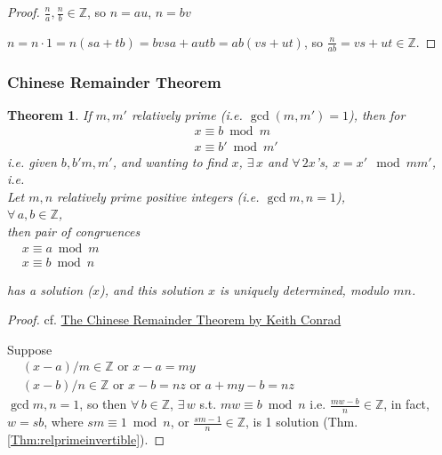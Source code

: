 \documentclass[10pt]{amsart}
\newtheorem{theorem}{Theorem}
\begin{document}
\begin{multicols*}{2}
\begin{proof}
	$\frac{n}{a}, \frac{n}{b} \in \mathbb{Z}$, so $n=au$, $n=bv$  
	
	$n = n\cdot 1 = n(sa+tb) = bvsa + autb = ab(vs + ut)$, so $\frac{n}{ab} = vs + ut \in \mathbb{Z}$.  
	\end{proof}

\subsubsection{Chinese Remainder Theorem}

\begin{theorem}
	If $m,m'$ relatively prime (i.e. $\gcd(m,m')=1$), then for 
\[
\begin{aligned}
	& x \equiv b \bmod{m} \\ 
	& x\equiv b'\bmod{m'}
\end{aligned}
\]
i.e. given $b,b'm,m'$, and wanting to find $x$, 
$\exists \, x$ and $\forall \, 2 x$'s, $x=x'\mod{mm'}$, i.e.  \\  

  Let $m,n$ relatively prime positive integers (i.e. $\gcd{m,n}=1$), \\
  $\forall \, a,b\in \mathbb{Z}$, \\
  then pair of congruences \\
  $\begin{aligned}
  & x \equiv a\bmod{m} \\
  & x \equiv b\bmod{n} 
  \end{aligned}$
 
 has a solution ($x$), and this solution $x$ is uniquely determined, modulo $mn$.  
\end{theorem}


\begin{proof}
cf. \href{http://www.math.uconn.edu/~kconrad/blurbs/ugradnumthy/crt.pdf}{The Chinese Remainder Theorem by Keith Conrad}


Suppose  \\
$
\begin{aligned}
& (x-a) / m \in \mathbb{Z} \text{ or } x - a = my \\ 
& (x-b)/n \in \mathbb{Z} \text{ or } x-b= nz \text{ or } a + my - b = nz 
\end{aligned}
$ \\
$\gcd{m,n}  =1$, so then $\forall \, b \in \mathbb{Z}$, $\exists \, w$ s.t. $mw \equiv b \bmod{n}$ i.e. $\frac{mw-b}{n} \in \mathbb{Z}$, in fact, $w=sb$, where $sm \equiv 1\bmod{n}$, or $\frac{sm-1}{n} \in \mathbb{Z}$, is 1 solution (Thm. \ref{Thm:relprimeinvertible}).  


\end{proof}
\end{multicols*}
\end{document}
